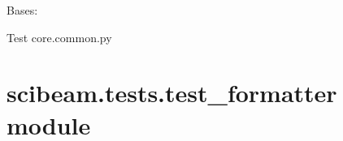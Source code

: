 \documentclass[letterpaper,10pt,english]{sphinxmanual}
\begin{document}
\begin{fulllineitems}
\label{\detokenize{scibeam.tests:scibeam.tests.test_common.TestFunctions}}
Bases: 

Test core.common.py

\begin{fulllineitems}
\label{\detokenize{scibeam.tests:scibeam.tests.test_common.TestFunctions.test_loadFile}}
\end{fulllineitems}


\begin{fulllineitems}
\label{\detokenize{scibeam.tests:scibeam.tests.test_common.TestFunctions.test_winPathHandler}}
\end{fulllineitems}


\end{fulllineitems}



\section{scibeam.tests.test\_formatter module}
\label{\detokenize{scibeam.tests:module-scibeam.tests.test_formatter}}\label{\detokenize{scibeam.tests:scibeam-tests-test-formatter-module}}
\end{document}
